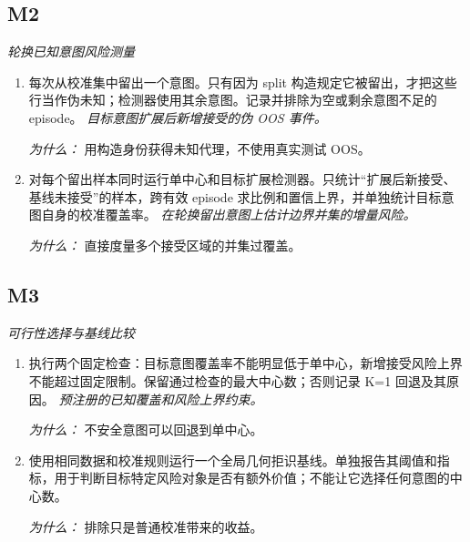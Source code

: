 \documentclass[10pt,a4paper]{article}
\begin{document}
\subsection*{M2}
\emph{轮换已知意图风险测量}
\begin{enumerate}[leftmargin=*,start=3]
  \item 每次从校准集中留出一个意图。只有因为 split 构造规定它被留出，才把这些行当作伪未知；检测器使用其余意图。记录并排除为空或剩余意图不足的 episode。
\noindent\emph{目标意图扩展后新增接受的伪 OOS 事件。}
\par{}
\par\emph{为什么：} 用构造身份获得未知代理，不使用真实测试 OOS。
  \item 对每个留出样本同时运行单中心和目标扩展检测器。只统计“扩展后新接受、基线未接受”的样本，跨有效 episode 求比例和置信上界，并单独统计目标意图自身的校准覆盖率。
\noindent\emph{在轮换留出意图上估计边界并集的增量风险。}
\par{}
\par\emph{为什么：} 直接度量多个接受区域的并集过覆盖。
\end{enumerate}
\subsection*{M3}
\emph{可行性选择与基线比较}
\begin{enumerate}[leftmargin=*,start=5]
  \item 执行两个固定检查：目标意图覆盖率不能明显低于单中心，新增接受风险上界不能超过固定限制。保留通过检查的最大中心数；否则记录 K=1 回退及其原因。
\noindent\emph{预注册的已知覆盖和风险上界约束。}
\par{}
\par\emph{为什么：} 不安全意图可以回退到单中心。
  \item 使用相同数据和校准规则运行一个全局几何拒识基线。单独报告其阈值和指标，用于判断目标特定风险对象是否有额外价值；不能让它选择任何意图的中心数。
\par\emph{为什么：} 排除只是普通校准带来的收益。
\end{enumerate}
\end{document}
